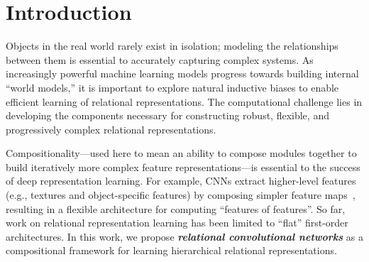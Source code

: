 \section{Introduction}\label{sec:intro}

Objects in the real world rarely exist in isolation; 
modeling the relationships between them is essential to accurately capturing complex systems. As increasingly powerful machine learning models progress towards building internal ``world models,'' it is important to explore natural inductive biases to enable efficient learning of relational representations. The computational challenge lies in developing the components necessary for constructing robust, flexible, and progressively complex relational representations.

Compositionality---used here to mean an ability to compose modules together to build iteratively more complex feature representations---is essential to the success of deep representation learning. 
For example, CNNs extract higher-level features (e.g., textures and object-specific features) by composing simpler feature maps~\citep{zeiler2014visualizing}, resulting in a flexible architecture for computing ``features of features''. So far, work on relational representation learning has been limited to ``flat'' first-order architectures. In this work, we propose \textit{\bfseries relational convolutional networks} as a compositional framework for learning hierarchical relational representations.

